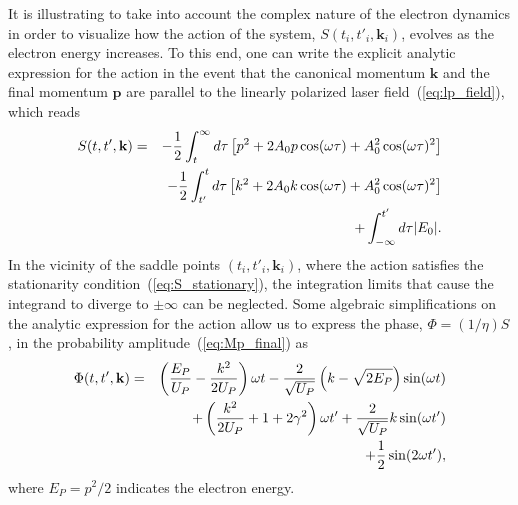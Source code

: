 It is illustrating to take into account the complex nature of the
electron dynamics in order to visualize how the action of the system,
$S(t_{i},t'_{i},\mathbf{k}_{i})$, evolves as the electron energy
increases. To this end, one can write the explicit analytic expression
for the action in the event that the canonical momentum $\mathbf{k}$
and the final momentum $\mathbf{p}$ are parallel to the linearly
polarized laser field~(\ref{eq:lp_field}), which reads
%
\begin{eqnarray}
  \label{eq:action_analytic}
S(t, t', \bf{k}) & = &
-\frac{1}{2} \int_{t}^{\infty} d\tau\left[ p^{2}
+ 2 A_{0} p \cos(\omega\tau) + A_{0}^{2} \cos(\omega\tau)^{2} \right]\nonumber\\
&& -\frac{1}{2} \int_{t'}^{t} d\tau\left[ k^{2}
+ 2 A_{0} k \cos(\omega\tau) + A_{0}^{2} \cos(\omega\tau)^{2} \right]\nonumber\\
&& + \int_{-\infty}^{t'} d\tau|E_{0}|.
\end{eqnarray}
%
In the vicinity of the saddle points $(t_{i},t'_{i},\mathbf{k}_{i})$,
where the action satisfies the stationarity
condition~(\ref{eq:S_stationary}), the integration limits that cause
the integrand to diverge to $\pm\infty$ can be neglected. Some
algebraic simplifications on the analytic expression for the action
allow us to express the phase, $\Phi = (1/\eta)S$, in the probability
amplitude~(\ref{eq:Mp_final}) as
%
\begin{eqnarray}
  \label{eq:phase_final}
\Phi(t, t', \bf{k}) & = &
\left(\frac{E_{P}}{U_{P}} - \frac{k^{2}}{2U_{P}}\right) \omega t
- \frac{2}{\sqrt{U_{P}}} \left( k - \sqrt{2E_{P}}\right) \sin(\omega t) \nonumber\\
&&
+ \left( \frac{k^{2}}{2U_{P}} + 1 + 2 \gamma^{2} \right)\omega t'
+ \frac{2}{\sqrt{U_{P}}} k \sin(\omega t') \nonumber\\
&&
+ \frac{1}{2} \sin(2\omega t'),
\end{eqnarray}
%
where $E_{P} = p^{2}/2$ indicates the electron energy.


